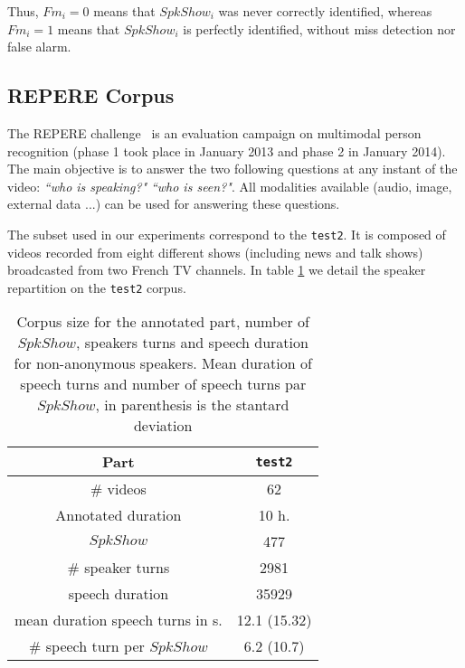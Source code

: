 Thus, $Fm_i=0$ means that $SpkShow_i$ was never correctly identified, whereas $Fm_i=1$ means that $SpkShow_i$ is perfectly identified, without miss detection nor false alarm.

\subsection{REPERE Corpus~\cite{Giraudel2012}}

The REPERE challenge~\cite{KAHN--CBMI--2012} is an evaluation campaign on multimodal person recognition (phase 1 took place in January 2013 and phase 2 in January 2014). The main objective is to answer the two following questions at any instant of the video: \emph{``who is speaking?"} \emph{``who is seen?"}. All modalities available (audio, image, external data ...) can be used for answering these questions. 

The subset used in our experiments correspond to the \texttt{test2}. It is composed of videos recorded from eight different shows (including news and talk shows) broadcasted from two French TV channels. In table \ref{tab:test2} we detail the speaker repartition on the \texttt{test2} corpus.


\begin{table}[ht]
  \centering
  \begin{tabular}{|c|c|}
    \hline
    Part                                & \texttt{test2}    \\
    \hline    
    \# videos                           & 62                \\         
    Annotated duration                  & 10 h.             \\
    \hline      
    $SpkShow$                           & 477               \\
    \# speaker turns                    & 2981              \\
    speech duration                     & 35929             \\
    mean duration speech turns in s.    & 12.1 (15.32)      \\
    \# speech turn per $SpkShow$        & 6.2 (10.7)        \\ 
    \hline                              
  \end{tabular}
  \caption{Corpus size for the annotated part, number of $SpkShow$, speakers turns and speech duration for non-anonymous speakers. Mean duration of speech turns and number of speech turns par $SpkShow$, in parenthesis is the stantard deviation}
  \label{tab:test2}  
\end{table}




